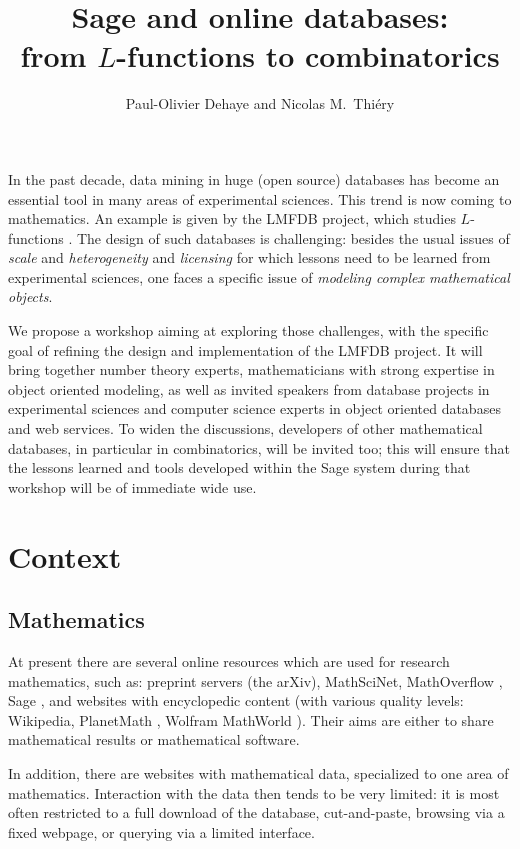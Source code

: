 \documentclass{article}
\author{Paul-Olivier Dehaye and Nicolas M.~Thi\'ery}
\title{\textsf{Sage} and online databases:\\ from $L$-functions to combinatorics}
\begin{document}
\maketitle

In the past decade, data mining in huge (open source) databases has
become an essential tool in many areas of experimental sciences. This
trend is now coming to mathematics. An example is given by the
LMFDB project, which studies $L$-functions \cite{LMFDB}.  The
design of such databases is challenging: besides the usual issues of
\emph{scale} and \emph{heterogeneity} and \emph{licensing} for which
lessons need to be learned from experimental sciences, one faces a
specific issue of \emph{modeling complex mathematical objects}.

We propose a workshop aiming at exploring those challenges, with the
specific goal of refining the design and implementation of the
LMFDB project. It will bring together number theory experts,
mathematicians with strong expertise in object oriented modeling, as
well as invited speakers from database projects in experimental
sciences and computer science experts in object oriented databases and
web services. To widen the discussions, developers of other
mathematical databases, in particular in combinatorics, will be
invited too; this will ensure that the lessons learned and tools
developed within the Sage system during that workshop will be of
immediate wide use.

\section{Context}
\subsection{Mathematics}
At present there are several online resources which are used for research mathematics, such as: preprint servers (the arXiv), MathSciNet, MathOverflow \cite{MO}, \textsf{Sage} \cite{sage}, and websites with encyclopedic content (with various quality levels: Wikipedia, PlanetMath \cite{planetmath}, Wolfram MathWorld \cite{MathWorld}). Their aims are either to share mathematical results or mathematical software. 

In addition, there are websites with mathematical data, specialized to one area of mathematics. Interaction with the data then tends to be very limited: it is most often restricted to a full download of the database, cut-and-paste, browsing via a fixed webpage, or querying via a limited interface. 
\end{document}
